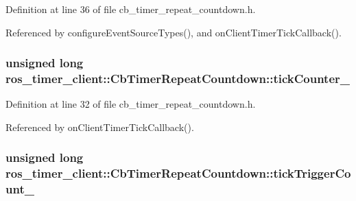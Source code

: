 Definition at line 36 of file cb\+\_\+timer\+\_\+repeat\+\_\+countdown.\+h.



Referenced by configure\+Event\+Source\+Types(), and on\+Client\+Timer\+Tick\+Callback().

\subsubsection[{\texorpdfstring{tick\+Counter\+\_\+}{tickCounter_}}]{\setlength{\rightskip}{0pt plus 5cm}unsigned long ros\+\_\+timer\+\_\+client\+::\+Cb\+Timer\+Repeat\+Countdown\+::tick\+Counter\+\_\+\hspace{0.3cm}{\ttfamily [private]}}\hypertarget{classros__timer__client_1_1CbTimerRepeatCountdown_a8984335d1a5b7a1da50cd1698047125f}{}\label{classros__timer__client_1_1CbTimerRepeatCountdown_a8984335d1a5b7a1da50cd1698047125f}


Definition at line 32 of file cb\+\_\+timer\+\_\+repeat\+\_\+countdown.\+h.



Referenced by on\+Client\+Timer\+Tick\+Callback().

\subsubsection[{\texorpdfstring{tick\+Trigger\+Count\+\_\+}{tickTriggerCount_}}]{\setlength{\rightskip}{0pt plus 5cm}unsigned long ros\+\_\+timer\+\_\+client\+::\+Cb\+Timer\+Repeat\+Countdown\+::tick\+Trigger\+Count\+\_\+\hspace{0.3cm}{\ttfamily [private]}}\hypertarget{classros__timer__client_1_1CbTimerRepeatCountdown_a6e32f68d5e54787ee80732c1ce4b08f4}{}\label{classros__timer__client_1_1CbTimerRepeatCountdown_a6e32f68d5e54787ee80732c1ce4b08f4}


